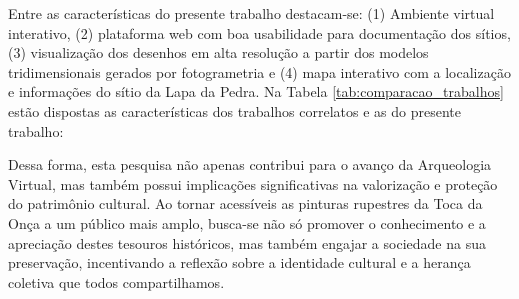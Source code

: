 Entre as características do presente trabalho destacam-se: (1) Ambiente virtual interativo, (2) plataforma web com boa usabilidade para documentação dos sítios, (3) visualização dos desenhos em alta resolução a partir dos modelos tridimensionais gerados por fotogrametria e (4) mapa interativo com a localização e informações do sítio da Lapa da Pedra. Na Tabela \ref{tab:comparacao_trabalhos} estão dispostas as características dos trabalhos correlatos e as do presente trabalho:
\begin{table}[h!]
\centering
{}
\caption{Comparação entre os trabalhos correlatos e o presente trabalho.}
\label{tab:comparacao_trabalhos}
\end{table}

Dessa forma, esta pesquisa não apenas contribui para o avanço da Arqueologia Virtual, mas também possui implicações significativas na valorização e proteção do patrimônio cultural. Ao tornar acessíveis as pinturas rupestres da Toca da Onça a um público mais amplo, busca-se não só promover o conhecimento e a apreciação destes tesouros históricos, mas também engajar a sociedade na sua preservação, incentivando a reflexão sobre a identidade cultural e a herança coletiva que todos compartilhamos.


